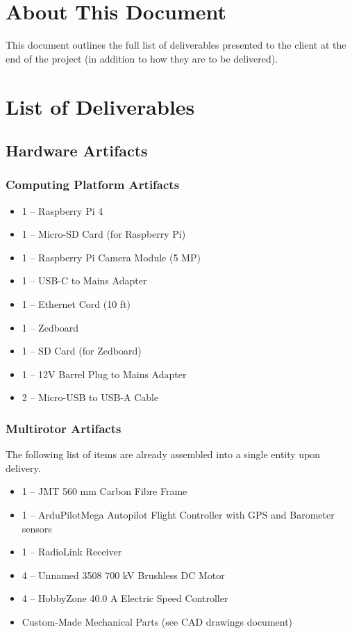 \documentclass[10pt,letterpaper]{article}
\begin{document}

\section{About This Document}
This document outlines the full list of deliverables presented to the client at the end of the project (in addition to how they are to be delivered).

\section{List of Deliverables}
\label{list}
\subsection{Hardware Artifacts}
\subsubsection{Computing Platform Artifacts}
\begin{itemize}
\item 1 -- Raspberry Pi 4
\item 1 -- Micro-SD Card (for Raspberry Pi)
\item 1 -- Raspberry Pi Camera Module (5 MP)
\item 1 -- USB-C to Mains Adapter
\item 1 -- Ethernet Cord (10 ft)
\item 1 -- Zedboard
\item 1 -- SD Card (for Zedboard)
\item 1 -- 12V Barrel Plug to Mains Adapter
\item 2 -- Micro-USB to USB-A Cable
\end{itemize}

\subsubsection{Multirotor Artifacts}

The following list of items are already assembled into a single entity upon delivery. 

\begin{itemize}
\item 1 -- JMT 560 mm Carbon Fibre Frame
\item 1 -- ArduPilotMega Autopilot Flight Controller with GPS and Barometer sensors
\item 1 -- RadioLink Receiver
\item 4 -- Unnamed 3508 700 kV Brushless DC Motor
\item 4 -- HobbyZone 40.0 A Electric Speed Controller
\item Custom-Made Mechanical Parts (see CAD drawings document)
\end{itemize}
\end{document}
